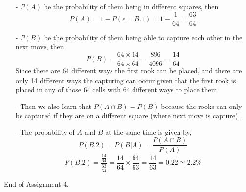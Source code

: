 \documentclass[12pt]{article}
\begin{document}
\begin{enumerate}[label=Part \Alph*)]
    \item[-] $P(A)$ be the probability of them being in different squares, then
    $$P(A) = 1 - P(\epsilon = B.1) = 1 - \frac{1}{64} = \frac{63}{64}$$
    \item[-] $P(B)$ be the probability of them being able to capture each other in the next move, then
    $$P(B) = \frac{64 \times 14}{64 \times 64} = \frac{896}{4096} = \frac{14}{64}$$
    Since there are 64 different ways the first rook can be placed, and there are only 14 different ways the capturing can occur given that the first rook is placed in any of those 64 cells with 64 different ways to place them.
    \item[-] Then we also learn that $P(A \cap B) = P(B)$ because the rooks can only be captured if they are on a different square (where next move is capture).
    \item[-] The probability of $A$ and $B$ at the same time is given by,
    $$P(B.2) = P(B|A) = \frac{P(A \cap B)}{P(A)}$$
    $$P(B.2) = \frac{\frac{14}{64}}{\frac{63}{64}} = \frac{14}{64} \times \frac{64}{63}= \frac{14}{63} = 0.2\bar{2} \simeq 2.2\%$$

\end{enumerate}
End of Assignment 4.
\end{document}
